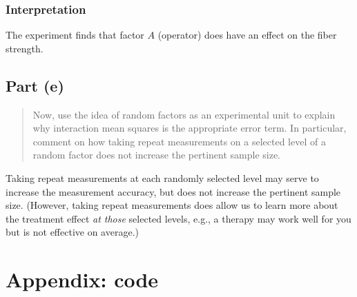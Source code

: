 \documentclass[
]{article}
\begin{document}
\hypertarget{interpretation-1}{%
\subsubsection{Interpretation}\label{interpretation-1}}

The experiment finds that factor \(A\) (operator) does have an effect on
the fiber strength.

\hypertarget{part-e-1}{%
\subsection{Part (e)}\label{part-e-1}}

\begin{quote}
Now, use the idea of random factors as an experimental unit to explain
why interaction mean squares is the appropriate error term. In
particular, comment on how taking repeat measurements on a selected
level of a random factor does not increase the pertinent sample size.
\end{quote}

Taking repeat measurements at each randomly selected level may serve to
increase the measurement accuracy, but does not increase the pertinent
sample size. (However, taking repeat measurements does allow us to learn
more about the treatment effect \emph{at those} selected levels, e.g., a
therapy may work well for you but is not effective on average.)

\hypertarget{appendix-code}{%
\section{Appendix: code}\label{appendix-code}}
\end{document}
